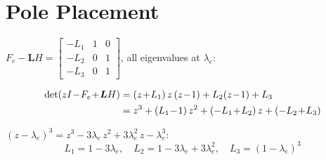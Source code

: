 \documentclass[11pt,a4paper]{article}
\renewcommand{\le}{\lambda_e}
\begin{document}
\section{Pole Placement}

$F_e - \bm{L}H
=\begin{bmatrix}-L_1&1&0\\-L_2&0&1\\-L_3&0&1\end{bmatrix}$,\quad
all eigenvalues at $\le$:

\begin{align}
  \det(zI\!-\!F_e\!+\!\bm{L}H)
  &= (z\!+\!L_1)\,z\,(z\!-\!1)
     + L_2(z\!-\!1) + L_3 \notag\\
  &= z^3 + (L_1\!-\!1)\,z^2
     + (-L_1\!+\!L_2)\,z
     + (-L_2\!+\!L_3)
  \label{eq:char}
\end{align}

$(z-\le)^3 = z^3 - 3\le\,z^2 + 3\le^2\,z - \le^3$:
\begin{equation}
  \boxed{\;
    L_1 = 1 - 3\le,\quad
    L_2 = 1 - 3\le + 3\le^2,\quad
    L_3 = (1 - \le)^3
  \;}
  \label{eq:gains}
\end{equation}
\end{document}
